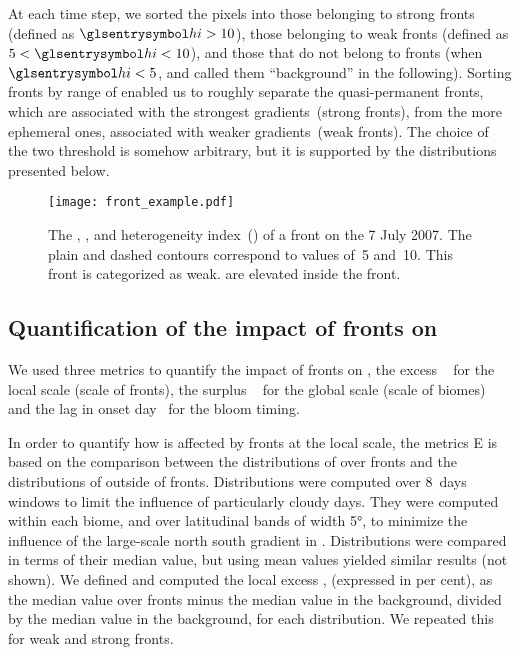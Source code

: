 At each time step, we sorted the pixels into those belonging to strong fronts (defined as \(\am{hi} > 10\)), those belonging to weak fronts (defined as \(5 < \am{hi} < 10\)), and those that do not belong to fronts (when \(\am{hi} < 5\), and called them ``background'' in the following).
Sorting fronts by range of  enabled us to roughly separate the quasi-permanent fronts, which are associated with the strongest  gradients~(strong fronts), from the more ephemeral ones, associated with weaker gradients~(weak fronts).
The choice of the two  threshold is somehow arbitrary, but it is supported by the  distributions presented below.


\begin{figure*}
  \texttt{[image: front\_example.pdf]}
  \caption{
    The , , and heterogeneity index~() of a front on the 7 July 2007.
    The plain and dashed contours correspond to  values of~5 and~10.
    This front is categorized as weak.
     are elevated inside the front.
  }%
  \label{fig:zoom}
\end{figure*}

\subsection{Quantification of the impact of fronts on }

We used three metrics to quantify the impact of fronts on , the excess ~ for the local scale (scale of fronts), the surplus ~ for the global scale (scale of biomes) and the lag in onset day~ for the bloom timing.

In order to quantify how  is affected by fronts at the local scale, the metrics E is based on the comparison between the distributions of  over fronts and the distributions of  outside of fronts.
Distributions were computed over 8~days windows to limit the influence of particularly cloudy days.
They were computed within each biome, and over latitudinal bands of width \ang{5}, to minimize the influence of the large-scale north south gradient in .
Distributions were compared in terms of their median value, but using mean values yielded similar results (not shown).
We defined and computed the local excess ,  (expressed in per cent), as the median value over fronts minus the median value in the background, divided by the median value in the background, for each distribution.
We repeated this for weak and strong fronts.

